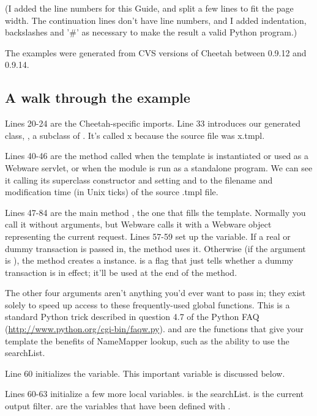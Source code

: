 (I added the line numbers for this Guide, and split a few lines to fit the
page width.  The continuation lines don't have line numbers, and I added
indentation, backslashes and '\#' as necessary to make the result a valid
Python program.)

The examples were generated from CVS versions of Cheetah between 0.9.12 and
0.9.14.

\subsection{A walk through the example}
\label{pyModules.walk}

Lines 20-24 are the Cheetah-specific imports.  Line 33 introduces our generated
class, , a subclass of .  It's called x because the
source file was x.tmpl.

Lines 40-46 are the  method called when the template is
instantiated or used as a Webware servlet, or when the module is run as a
standalone program.  We can see it calling its superclass constructor and
setting  and  to the filename and
modification time (in Unix ticks) of the source .tmpl file.

Lines 47-84 are the main method , the one that fills the
template.  Normally you call it without arguments, but Webware calls it with a
Webware  object representing the current request.  Lines
57-59 set up the  variable.  If a real or dummy transaction is
passed in, the method uses it.  Otherwise (if the  argument is
), the method creates a  instance.
 is a flag that just tells whether a dummy transaction is in
effect; it'll be used at the end of the method.  

The other four  arguments aren't anything you'd ever want to
pass in; they exist solely to speed up access to these frequently-used
global functions.  This is a standard Python trick described in question 4.7
of the Python FAQ (\url{http://www.python.org/cgi-bin/faqw.py}).
 and  are the functions that give your template the
benefits of NameMapper lookup, such as the ability to use the searchList.  

Line 60 initializes the  variable.  This important variable is
discussed below.  

Lines 60-63 initialize a few more local variables.   is the 
searchList.   is the current output filter.  
are the variables that have been defined with .

